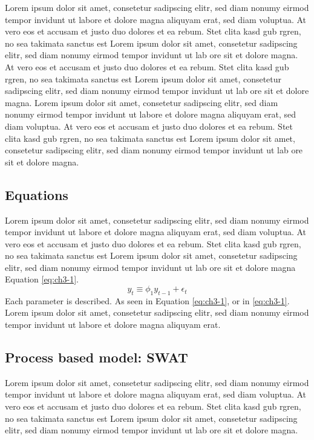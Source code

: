 Lorem ipsum dolor sit amet, consetetur sadipscing elitr, sed diam nonumy eirmod tempor invidunt ut labore et dolore magna aliquyam erat, sed diam voluptua. At vero eos et accusam et justo duo dolores et ea rebum. Stet clita kasd gub rgren, no sea takimata sanctus est Lorem ipsum dolor sit amet, consetetur sadipscing elitr, sed diam nonumy eirmod tempor invidunt ut lab ore sit et dolore magna.
At vero eos et accusam et justo duo dolores et ea rebum. Stet clita kasd gub rgren, no sea takimata sanctus est Lorem ipsum dolor sit amet, consetetur sadipscing elitr, sed diam nonumy eirmod tempor invidunt ut lab ore sit et dolore magna.
Lorem ipsum dolor sit amet, consetetur sadipscing elitr, sed diam nonumy eirmod tempor invidunt ut labore et dolore magna aliquyam erat, sed diam voluptua. At vero eos et accusam et justo duo dolores et ea rebum. Stet clita kasd gub rgren, no sea takimata sanctus est Lorem ipsum dolor sit amet, consetetur sadipscing elitr, sed diam nonumy eirmod tempor invidunt ut lab ore sit et dolore magna.

\subsection{Equations}

Lorem ipsum dolor sit amet, consetetur sadipscing elitr, sed diam nonumy eirmod tempor invidunt ut labore et dolore magna aliquyam erat, sed diam voluptua. At vero eos et accusam et justo duo dolores et ea rebum. Stet clita kasd gub rgren, no sea takimata sanctus est  Lorem ipsum dolor sit amet, consetetur sadipscing elitr,  sed diam nonumy eirmod tempor invidunt ut lab  ore sit et dolore magna Equation \eqref{eq:ch3-1}.
\begin{equation}
\label{eq:ch3-1}
   y_{t}  \equiv \phi_{1} y_{t-1} + \epsilon_{t}
\end{equation}
%
Each parameter is described. As seen in Equation \eqref{eq:ch3-1}, or in \eqref{eq:ch3-1}. Lorem ipsum dolor sit amet, consetetur sadipscing elitr, sed diam nonumy eirmod tempor invidunt ut labore et dolore magna aliquyam erat.

\subsection{Process based model: SWAT}

Lorem ipsum dolor sit amet, consetetur sadipscing elitr, sed diam nonumy eirmod tempor invidunt ut labore et dolore magna aliquyam erat, sed diam voluptua. At vero eos et accusam et justo duo dolores et ea rebum. Stet clita kasd gub rgren, no sea takimata sanctus est Lorem ipsum dolor sit amet, consetetur sadipscing elitr, sed diam nonumy eirmod tempor invidunt ut lab ore sit et dolore magna.

